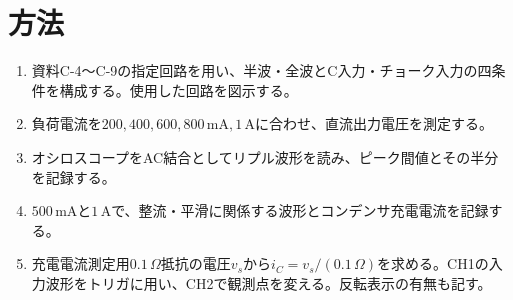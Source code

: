 \documentclass[lualatex,a4paper,10pt]{jlreq}
\begin{document}
\section{方法}\label{sec:auto4}
\begin{enumerate}
\item 資料C-4〜C-9の指定回路を用い、半波・全波とC入力・チョーク入力の四条件を構成する。使用した回路を図示する。
\item 負荷電流を$200,400,600,800\,\mathrm{mA},1\,\mathrm{A}$に合わせ、直流出力電圧を測定する。
\item オシロスコープをAC結合としてリプル波形を読み、ピーク間値とその半分を記録する。
\item $500\,\mathrm{mA}$と$1\,\mathrm{A}$で、整流・平滑に関係する波形とコンデンサ充電電流を記録する。
\item 充電電流測定用$0.1\,\Omega$抵抗の電圧$v_s$から$i_C=v_s/(0.1\,\Omega)$を求める。CH1の入力波形をトリガに用い、CH2で観測点を変える。反転表示の有無も記す。
\end{enumerate}
\end{document}
